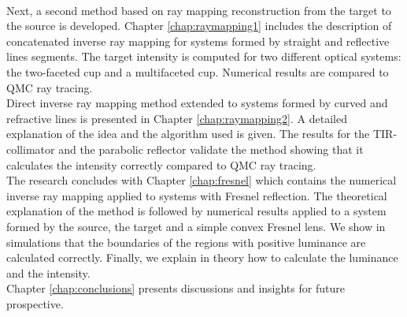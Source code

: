 \\ \indent Next, a second method based on ray mapping reconstruction from the target to the source is developed. Chapter \ref{chap:raymapping1} includes the description of concatenated inverse ray mapping for systems formed by straight and reflective lines segments. The target intensity is computed for two different optical systems: the two-faceted cup and a multifaceted cup. Numerical results are compared to QMC ray tracing. \\ \indent Direct inverse ray mapping method extended to systems formed by curved and refractive lines is presented in
Chapter \ref{chap:raymapping2}. A detailed explanation of the idea and the algorithm used is given. The results for the TIR-collimator and the parabolic reflector validate the method showing that it calculates the intensity correctly compared to QMC ray tracing. \\ \indent
The research concludes with Chapter \ref{chap:fresnel} which contains the numerical inverse ray mapping applied to systems with Fresnel reflection. The theoretical explanation of the method is followed by numerical results applied to a system formed by the source, the target and a simple convex Fresnel lens. We show in simulations that the boundaries of the regions with positive luminance are calculated correctly. Finally, we explain in theory how to calculate the luminance and the intensity. \\ \indent Chapter \ref{chap:conclusions} presents discussions and insights for future prospective.
\clearpage{\pagestyle{empty}\cleardoublepage}
 